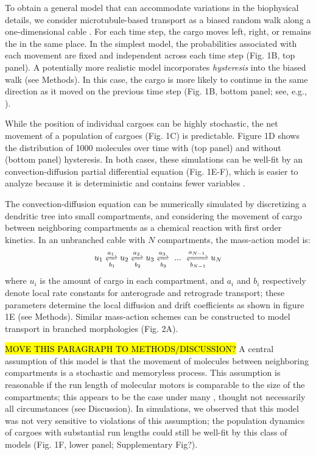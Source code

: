 \documentclass[10pt]{wlpeerj}
\begin{document}
To obtain a general model that can accommodate variations in the biophysical details, we consider microtubule-based transport as a biased random walk along a one-dimensional cable \citep{Bressloff_2006,Newby_2010,Bressloff_2009}.
For each time step, the cargo moves left, right, or remains the in the same place.
In the simplest model, the probabilities associated with each movement are fixed and independent across each time step (Fig. 1B, top panel).
A potentially more realistic model incorporates \textit{hysteresis} into the biased walk (see Methods). In this case, the cargo is more likely to continue in the same direction as it moved on the previous time step (Fig. 1B, bottom panel; see, e.g., \cite{Soundararajan_2014}).

While the position of individual cargoes can be highly stochastic, the net movement of a population of cargoes (Fig. 1C) is predictable.
Figure 1D shows the distribution of 1000 molecules over time with (top panel) and without (bottom panel) hysteresis.
In both cases, these simulations can be well-fit by an convection-diffusion partial differential equation (Fig. 1E-F), which is easier to analyze because it is deterministic and contains fewer variables \citep{Smith_2001}.

The convection-diffusion equation can be numerically simulated by discretizing a dendritic tree into small compartments, and considering the movement of cargo between neighboring compartments as a chemical reaction with first order kinetics. In an unbranched cable with $N$ compartments, the mass-action model is:
\begin{equation}
u_1 \xrightleftharpoons[b_1]{a_1} u_2 \xrightleftharpoons[b_2]{a_2} u_3 \xrightleftharpoons[b_3]{a_3} ~...~ \xrightleftharpoons[b_{N-1}]{a_{N-1}} u_N
\end{equation}
where $u_i$ is the amount of cargo in each compartment, and $a_i$ and $b_i$ respectively denote local rate constants for anterograde and retrograde transport; these parameters determine the local diffusion and drift coefficients as shown in figure 1E (see Methods). Similar mass-action schemes can be constructed to model transport in branched morphologies (Fig. 2A).

\hl{MOVE THIS PARAGRAPH TO METHODS/DISCUSSION?} A central assumption of this model is that the movement of molecules between neighboring compartments is a stochastic and memoryless process. This assumption is reasonable if the run length of molecular motors is comparable to the size of the compartments; this appears to be the case under many \citep{Muller_2008,Verbrugge_2009}, thought not necessarily all \citep{Dynes_2007} circumstances (see Discussion). In simulations, we observed that this model was not very sensitive to violations of this assumption; the population dynamics of cargoes with substantial run lengths could still be well-fit by this class of models (Fig. 1F, lower panel; Supplementary Fig?).
\end{document}

